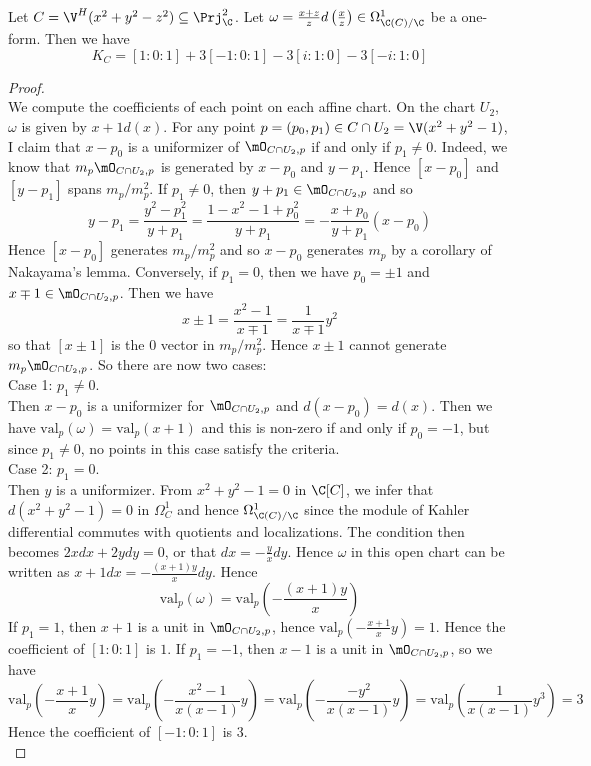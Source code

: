 \documentclass[a4paper]{article}
\begin{document}
\begin{eg}{}{}\\
Let $C=\V^H(x^2+y^2-z^2)\subseteq\Prj_\C^2$. Let $\omega=\frac{x+z}{z}d\left(\frac{x}{z}\right)\in\Omega_{\C(C)/\C}^1$ be a one-form. Then we have $$K_C=[1:0:1]+3[-1:0:1]-3[i:1:0]-3[-i:1:0]$$
\begin{proof}\\
We compute the coefficients of each point on each affine chart. On the chart $U_2$, $\omega$ is given by $x+1d(x)$. For any point $p=(p_0,p_1)\in C\cap U_2=\V(x^2+y^2-1)$, I claim that $x-p_0$ is a uniformizer of $\mO_{C\cap U_2,p}$ if and only if $p_1\neq 0$. Indeed, we know that $m_p\mO_{C\cap U_2,p}$ is generated by $x-p_0$ and $y-p_1$. Hence $[x-p_0]$ and $[y-p_1]$ spans $m_p/m_p^2$. If $p_1\neq 0$, then $y+p_1\in\mO_{C\cap U_2,p}$ and so $$y-p_1=\frac{y^2-p_1^2}{y+p_1}=\frac{1-x^2-1+p_0^2}{y+p_1}=-\frac{x+p_0}{y+p_1}(x-p_0)$$ Hence $[x-p_0]$ generates $m_p/m_p^2$ and so $x-p_0$ generates $m_p$ by a corollary of Nakayama's lemma. Conversely, if $p_1=0$, then we have $p_0=\pm1$ and $x\mp1\in\mO_{C\cap U_2,p}$. Then we have $$x\pm1=\frac{x^2-1}{x\mp1}=\frac{1}{x\mp1}y^2$$ so that $[x\pm 1]$ is the $0$ vector in $m_p/m_p^2$. Hence $x\pm 1$ cannot generate $m_p\mO_{C\cap U_2,p}$. So there are now two cases: \\

Case 1: $p_1\neq 0$. \\
Then $x-p_0$ is a uniformizer for $\mO_{C\cap U_2,p}$ and $d(x-p_0)=d(x)$. Then we have $\text{val}_p(\omega)=\text{val}_p(x+1)$ and this is non-zero if and only if $p_0=-1$, but since $p_1\neq 0$, no points in this case satisfy the criteria. \\

Case 2: $p_1=0$. \\
Then $y$ is a uniformizer. From $x^2+y^2-1=0$ in $\C[C]$, we infer that $d(x^2+y^2-1)=0$ in $\Omega_C^1$ and hence $\Omega_{\C(C)/\C}^1$ since the module of Kahler differential commutes with quotients and localizations. The condition then becomes $2xdx+2ydy=0$, or that $dx=-\frac{y}{x}dy$. Hence $\omega$ in this open chart can be written as $x+1dx=-\frac{(x+1)y}{x}dy$. Hence $$\text{val}_p(\omega)=\text{val}_p\left(-\frac{(x+1)y}{x}\right)$$ If $p_1=1$, then $x+1$ is a unit in $\mO_{C\cap U_2,p}$, hence $\text{val}_p\left(-\frac{x+1}{x}y\right)=1$. Hence the coefficient of $[1:0:1]$ is $1$. If $p_1=-1$, then $x-1$ is a unit in $\mO_{C\cap U_2,p}$, so we have $$\text{val}_p\left(-\frac{x+1}{x}y\right)=\text{val}_p\left(-\frac{x^2-1}{x(x-1)}y\right)=\text{val}_p\left(-\frac{-y^2}{x(x-1)}y\right)=\text{val}_p\left(\frac{1}{x(x-1)}y^3\right)=3$$ Hence the coefficient of $[-1:0:1]$ is $3$. \\


\end{proof}
\end{eg}
\end{document}

